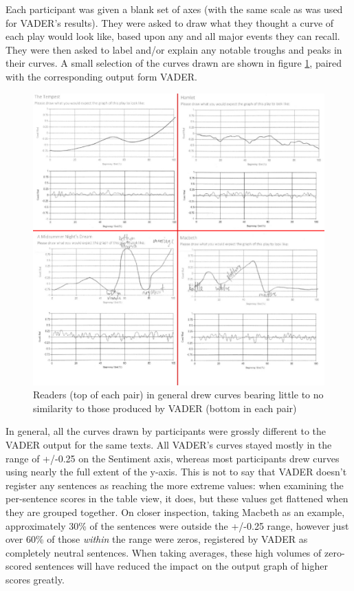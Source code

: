\documentclass{article}
\begin{document}
            Each participant was given a blank set of axes (with the same scale as was used for VADER's results). They were asked to draw what they thought a curve of each play would look like, based upon any and all major events they can recall. They were then asked to label and/or explain any notable troughs and peaks in their curves. A small selection of the curves drawn are shown in figure \ref{fig:readerVsVader}, paired with the corresponding output form VADER.
            \begin{figure}
                \includegraphics[width=1\textwidth]{Figures/Survey/readerVsVader}
                \centering
                \caption{Readers (top of each pair) in general drew curves bearing little to no similarity to those produced by VADER (bottom in each pair)}
                \label{fig:readerVsVader}
            \end{figure}
            In general, all the curves drawn by participants were grossly different to the VADER output for the same texts. All VADER's curves stayed mostly in the range of +/-0.25 on the Sentiment axis, whereas most participants drew curves using nearly the full extent of the y-axis. This is not to say that VADER doesn't register any sentences as reaching the more extreme values: when examining the per-sentence scores in the table view, it does, but these values get flattened when they are grouped together. On closer inspection, taking Macbeth as an example, approximately 30\% of the sentences were outside the +/-0.25 range, however  just over 60\% of those \emph{within} the range were zeros, registered by VADER as completely neutral sentences. When taking averages, these high volumes of zero-scored sentences will have reduced the impact on the output graph of higher scores greatly.
\end{document}
